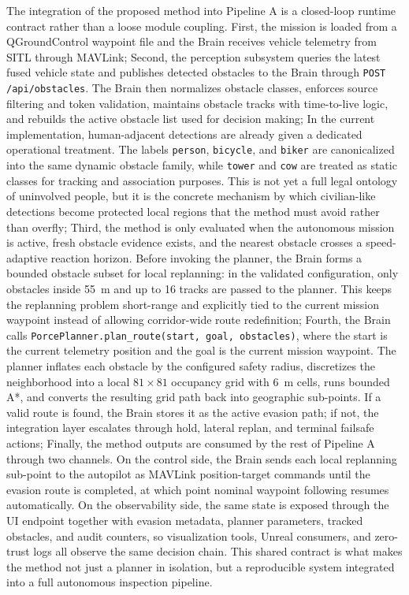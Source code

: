 \documentclass[a4paper,11pt]{article}
\begin{document}
The integration of the proposed method into Pipeline A is a closed-loop runtime contract rather than a loose module coupling. 
\newline
First, the mission is loaded from a QGroundControl waypoint file and the Brain receives vehicle telemetry from SITL through MAVLink;
\newline 
Second, the perception subsystem queries the latest fused vehicle state and publishes detected obstacles to the Brain through \texttt{POST /api/obstacles}. The Brain then normalizes obstacle classes, enforces source filtering and token validation, maintains obstacle tracks with time-to-live logic, and rebuilds the active obstacle list used for decision making;
\newline
In the current implementation, human-adjacent detections are already given a dedicated operational treatment. The labels \texttt{person}, \texttt{bicycle}, and \texttt{biker} are canonicalized into the same dynamic obstacle family, while \texttt{tower} and \texttt{cow} are treated as static classes for tracking and association purposes. This is not yet a full legal ontology of uninvolved people, but it is the concrete mechanism by which civilian-like detections become protected local regions that the method must avoid rather than overfly;
\newline
Third, the method is only evaluated when the autonomous mission is active, fresh obstacle evidence exists, and the nearest obstacle crosses a speed-adaptive reaction horizon. Before invoking the planner, the Brain forms a bounded obstacle subset for local replanning: in the validated configuration, only obstacles inside \SI{55}{\meter} and up to 16 tracks are passed to the planner. This keeps the replanning problem short-range and explicitly tied to the current mission waypoint instead of allowing corridor-wide route redefinition; 
\newline
Fourth, the Brain calls \texttt{PorcePlanner.plan\_route(start, goal, obstacles)}, where the start is the current telemetry position and the goal is the current mission waypoint. The planner inflates each obstacle by the configured safety radius, discretizes the neighborhood into a local \(81 \times 81\) occupancy grid with \SI{6}{\meter} cells, runs bounded A*, and converts the resulting grid path back into geographic sub-points. If a valid route is found, the Brain stores it as the active evasion path; if not, the integration layer escalates through hold, lateral replan, and terminal failsafe actions;
\newline
Finally, the method outputs are consumed by the rest of Pipeline A through two channels. On the control side, the Brain sends each local replanning sub-point to the autopilot as MAVLink position-target commands until the evasion route is completed, at which point nominal waypoint following resumes automatically. On the observability side, the same state is exposed through the UI endpoint together with evasion metadata, planner parameters, tracked obstacles, and audit counters, so visualization tools, Unreal consumers, and zero-trust logs all observe the same decision chain. This shared contract is what makes the method not just a planner in isolation, but a reproducible system integrated into a full autonomous inspection pipeline.
\end{document}
